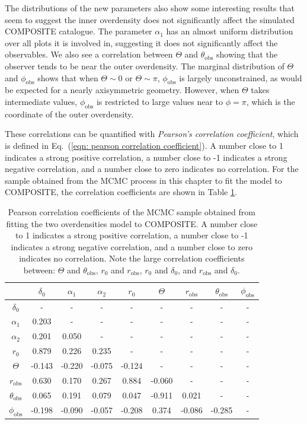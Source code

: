 \documentclass[a4paper,12pt]{report}
\renewcommand{\eqref}[1]{Eq.~({#1})}
\begin{document}
The distributions of the new parameters also show some interesting results that seem to suggest the inner overdensity does not significantly affect the simulated COMPOSITE catalogue. The parameter $\alpha_1$ has an almost uniform distribution over all plots it is involved in, suggesting it does not significantly affect the observables. We also see a correlation between $\Theta$ and $\theta_\text{obs}$ showing that the observer tends to be near the outer overdensity. The marginal distribution of $\Theta$ and $\phi_\text{obs}$ shows that when $\Theta \sim 0$  or $\Theta \sim \pi$, $\phi_\text{obs}$ is largely unconstrained, as would be expected for a nearly axisymmetric geometry. However, when $\Theta$ takes intermediate values, $\phi_\text{obs}$ is restricted to large values near to $\phi=\pi$, which is the coordinate of the outer overdensity.

These correlations can be quantified with \textit{Pearson's correlation coefficient}, which is defined in \eqref{\ref{eqn: pearson correlation coefficient}}. A number close to 1 indicates a strong positive correlation, a number close to -1 indicates a strong negative correlation, and a number close to zero indicates no correlation. For the sample obtained from the MCMC process in this chapter to fit the model to COMPOSITE, the correlation coefficients are shown in Table \ref{tab: two_structures correlation coefficients}.

\begin{table}[!t]
    \centering
    \begin{tabular}{c|c c c c c c c c}
         & $\delta_0$ & $\alpha_1$ & $\alpha_2$ & $r_0$ & $\Theta$ & $r_\text{obs}$ & $\theta_\text{obs}$ & $\phi_\text{obs}$\\
         \hline
        $\delta_0$ & - & - & - & - & - & - & - & - \\
        $\alpha_1$ & 0.203 & - & - & - & - & - & - & - \\
        $\alpha_2$ & 0.201 & 0.050 & - & - & - & - & - & - \\
        $r_0$ & 0.879 & 0.226 & 0.235 & - & - & - & - & - \\
        $\Theta$ & -0.143 & -0.220 & -0.075 & -0.124 & - & - & - & - \\
        $r_\text{obs}$ & 0.630 & 0.170 & 0.267 & 0.884 & -0.060 & - & - & - \\
        $\theta_\text{obs}$ & 0.065 & 0.191 & 0.079 & 0.047 & -0.911 & 0.021 & - & - \\
        $\phi_\text{obs}$ & -0.198 & -0.090 & -0.057 & -0.208 & 0.374 & -0.086 & -0.285 & -
    \end{tabular}
    \caption{Pearson correlation coefficients of the MCMC sample obtained from fitting the two overdensities model to COMPOSITE. A number close to 1 indicates a strong positive correlation, a number close to -1 indicates a strong negative correlation, and a number close to zero indicates no correlation. Note the large correlation coefficients between: $\Theta$ and $\theta_\text{obs}$, $r_0$ and $r_\text{obs}$, $r_0$ and $\delta_0$, and $r_\text{obs}$ and $\delta_0$.}
    \label{tab: two_structures correlation coefficients}
\end{table}
\end{document}
